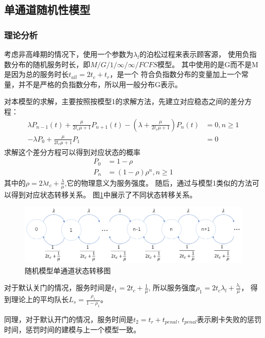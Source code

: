 \subsection{单通道随机性模型}
\subsubsection{理论分析}
考虑非高峰期的情况下，使用一个参数为$\lambda_{l}$的泊松过程来表示顾客源，
使用负指数分布的随机服务时长，即$M/G/1/\infty/\infty/FCFS$模型。
其中使用的是G而不是M是因为总的服务时长$t_{all}=2t_{c}+t_{r}$，是一个
符合负指数分布的变量加上一个常量，并不是严格的负指数分布，所以用一般分布G表示。
\par 对本模型的求解，主要按照按模型1的求解方法，先建立对应稳态之间的差分方程：
\begin{equation}
    \begin{aligned}
        \lambda P_{n-1}(t)+\frac{\mu}{2t_c\mu+1} P_{n+1}(t)-(\lambda+\frac{\mu}{2t_c\mu+1} )P_n(t)& =0,n\geq 1 \\
        -\lambda P_{0}+\frac{\mu}{2t_c\mu+1} P_{1}&=0
    \end{aligned}
\end{equation}
求解这个差分方程可以得到对应状态的概率
\begin{equation}
    \begin{aligned}
        P_0 &=1-\rho \\
        P_n &=(1-\rho)\rho^n,n\geq1
    \end{aligned}
\end{equation}
其中的$\rho=2\lambda t_c+\frac{\lambda}{\mu}$,它的物理意义为服务强度。
随后，通过与模型1类似的方法可以得到对应状态转移关系。
图\ref{fig:transform2}中展示了不同状态转移关系。
\begin{figure}[ht]
    \centering
    \includegraphics[width=.6\textwidth]{images/transform2.PNG}
    \caption{随机模型单通道状态转移图}
    \label{fig:transform2}
\end{figure}
\par 对于默认关门的情况，服务时间是$t_1=2t_c+\frac{1}{\mu}$,
所以服务强度$\rho_1=2t_c\lambda_l+\frac{\lambda_l}{\mu}$，
得到理论上的平均队长$L_s=\frac{\rho_1}{1-\rho_1}$。
\par 同理，对于默认开门的情况，服务时间是$t_2=t_r+t_{penal}$,
$t_{penal}$表示刷卡失败的惩罚时间，惩罚时间的建模与上一个模型一致。

